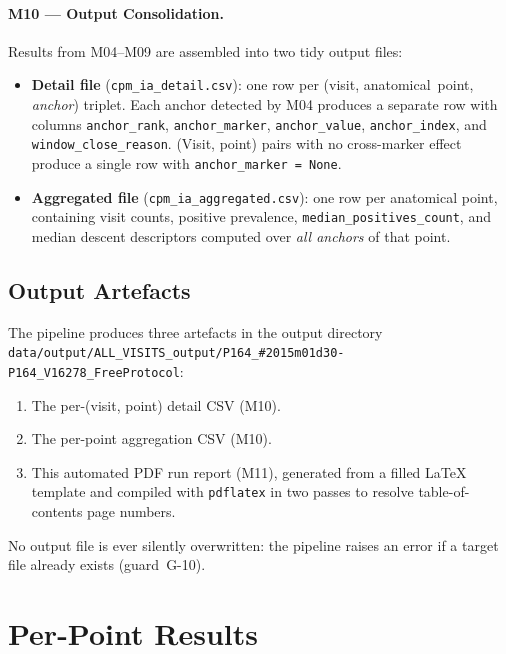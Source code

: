 \documentclass[a4paper,11pt]{article}
\begin{document}
\paragraph{M10 --- Output Consolidation.}
Results from M04--M09 are assembled into two tidy output files:
\begin{itemize}
  \item \textbf{Detail file} (\texttt{cpm\_ia\_detail.csv}): one row per
        (visit, anatomical~point, \emph{anchor}) triplet. Each anchor detected by M04
        produces a separate row with columns \texttt{anchor\_rank},
        \texttt{anchor\_marker}, \texttt{anchor\_value}, \texttt{anchor\_index},
        and \texttt{window\_close\_reason}.
        (Visit, point) pairs with no cross-marker effect produce a single row with
        \texttt{anchor\_marker = None}.
  \item \textbf{Aggregated file} (\texttt{cpm\_ia\_aggregated.csv}): one row per
        anatomical point, containing visit counts, positive prevalence,
        \texttt{median\_positives\_count}, and median descent descriptors computed over
        \emph{all anchors} of that point.
\end{itemize}

\subsection{Output Artefacts}

The pipeline produces three artefacts in the output directory \texttt{data/output/ALL\_VISITS\_output/P164\_\#2015m01d30-P164\_V16278\_FreeProtocol}:
\begin{enumerate}
  \item The per-(visit, point) detail CSV (M10).
  \item The per-point aggregation CSV (M10).
  \item This automated PDF run report (M11), generated from a filled \LaTeX{} template
        and compiled with \texttt{pdflatex} in two passes to resolve table-of-contents
        page numbers.
\end{enumerate}
No output file is ever silently overwritten: the pipeline raises an error if a target
file already exists (guard~G-10).

\section{Per-Point Results}
\end{document}
